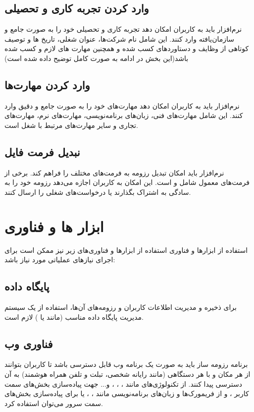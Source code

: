 \documentclass[]{article}
\begin{document}
	\subsection{\LARGE{وارد کردن تجربه کاری و تحصیلی}}
	نرم‌افزار باید به کاربران امکان دهد تجربه کاری و تحصیلی خود را به صورت جامع و سازمان‌یافته وارد کنند. این شامل نام شرکت‌ها، عنوان شغلی، تاریخ ها و توصیف کوتاهی از وظایف و دستاوردهای کسب شده و همچنین مهارت های لازم و کسب شده باشد(این بخش در ادامه به صورت کامل توضیح داده شده است)
	
	
	\subsection{\LARGE{وارد کردن مهارت‌ها}}
	نرم‌افزار باید به کاربران امکان دهد مهارت‌های خود را به صورت جامع و دقیق وارد کنند. این شامل مهارت‌های فنی، زبان‌های برنامه‌نویسی، مهارت‌های نرم، مهارت‌های تجاری و سایر مهارت‌های مرتبط با شغل است.
	
	\subsection{\LARGE{نبدیل فرمت فایل}}
	نرم‌افزار باید امکان  تبدیل رزومه به فرمت‌های مختلف را فراهم کند. برخی از فرمت‌های معمول شامل  و  است. این امکان به کاربران اجازه می‌دهد رزومه خود را به سادگی به اشتراک بگذارند یا درخواست‌های شغلی را ارسال کنند.
	
	\section{\huge{ابزار ها و فناوری}}
	استفاده از ابزارها و فناوری  استفاده از ابزارها و فناوری‌های زیر نیز ممکن است برای اجرای نیازهای عملیاتی مورد نیاز باشد:
	
	\subsection{\LARGE{پایگاه داده}}
	برای ذخیره و مدیریت اطلاعات کاربران و رزومه‌های آن‌ها، استفاده از یک سیستم مدیریت پایگاه داده مناسب (مانند  یا ) لازم است.
	
	\subsection{\LARGE{فناوری وب}}
	
	برنامه رزومه ساز باید به صورت یک برنامه وب قابل دسترسی باشد تا کاربران بتوانند از هر مکان و با هر دستگاهی (مانند رایانه شخصی، تبلت و تلفن همراه هوشمند) به آن دسترسی پیدا کنند. از تکنولوژی‌های مانند 
	، ، ، و...  
	جهت پیاده‌سازی بخش‌های سمت کاربر ، و از فریمورک‌ها و زبان‌های برنامه‌نویسی مانند 
	، ،  یا  برای پیاده‌سازی بخش‌های سمت سرور
	  می‌توان استفاده کرد.
	
\end{document}
